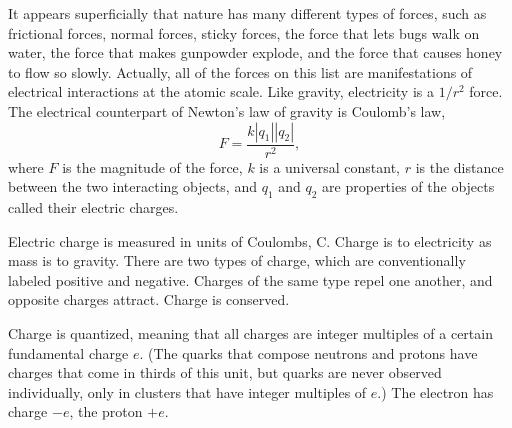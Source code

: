It appears superficially that nature has many different types of forces, such
as frictional forces, normal forces, sticky forces, the force that lets bugs
walk on water, the force that makes gunpowder explode,
and the force that causes honey to flow so slowly. 
Actually, all of the forces on this list are manifestations of electrical
interactions at the atomic scale. Like gravity, electricity is a $1/r^2$ force.
The electrical counterpart of Newton's law of gravity is Coulomb's law,
\begin{equation}
  F = \frac{k|q_1||q_2|}{r^2},
\end{equation}
where $F$ is the magnitude of the force, $k$ is a universal constant, $r$ is
the distance between the two interacting objects, and $q_1$ and $q_2$ are properties
of the objects called their electric charges.

Electric charge is measured in units
of Coulombs, C. Charge is to electricity as mass is to gravity. There are two
types of charge, which are conventionally labeled positive and negative.
Charges of the same type repel one another, and opposite charges attract.
Charge is conserved.

Charge is quantized, meaning that all charges are integer multiples of a certain
fundamental charge $e$. (The quarks that compose neutrons and protons have charges
that come in thirds of this unit, but quarks are never observed individually, only
in clusters that have integer multiples of $e$.) The electron has charge $-e$, the
proton $+e$.
